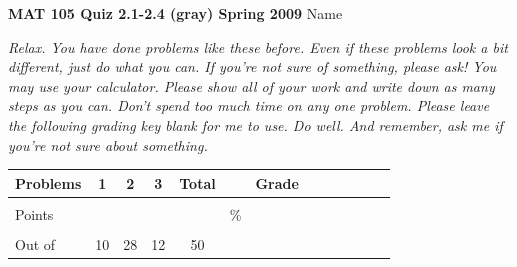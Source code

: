 \documentclass[12pt]{article}
\begin{document}
{\bf MAT 105 Quiz 2.1-2.4 (gray) Spring 2009} \hspace{.4in} {\large Name} \hrulefill

\hrulefill

 \emph{Relax.  You have done problems like these before.  Even if these problems look a bit different, just do what you can.  If you're not sure of something, please ask! You may use your calculator.  Please show all of your work and write down as many steps as you can.  Don't spend too much time on any one problem.  Please leave the following grading key blank for me to use.  Do well.  And remember, ask me if you're not sure about something.}

\begin{center}

\begin{tabular}
{|l|c|c|c|c|c|c|c|c|c|c|c|c|} \hline

 Problems & \hspace{5 pt} 1 \hspace{5 pt}  & \hspace{5 pt} 2 \hspace{5 pt} & \hspace{5 pt} 3 \hspace{5 pt} &  \hspace{5 pt} Total  \hspace{5 pt} & &  \hspace{5 pt} Grade \hspace{5 pt}  \\ \hline
&&&&&&\\  
Points &&&&&    \hspace{.8in}\% &  \\ 
&&&&&& \\  \hline
Out of & 10 & 28 & 12 &50 & & \\ \hline

\end {tabular}

\end{center}

\hrulefill
\end{document}
